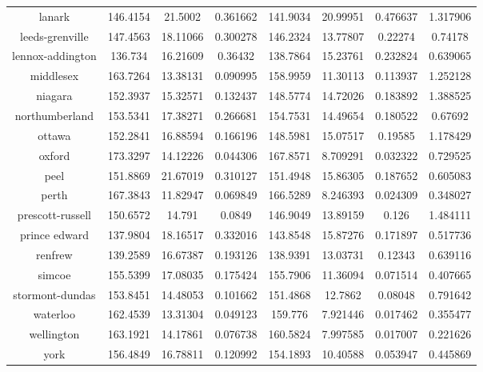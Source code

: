 \begin{table}[H]
\begin{tabular}{|c|ccc|ccc|c|}
lanark                    & 146.4154 & 21.5002  & 0.361662 & 141.9034 & 20.99951 & 0.476637 & 1.317906 \\
leeds-grenville           & 147.4563 & 18.11066 & 0.300278 & 146.2324 & 13.77807 & 0.22274  & 0.74178  \\
lennox-addington          & 136.734  & 16.21609 & 0.36432  & 138.7864 & 15.23761 & 0.232824 & 0.639065 \\
middlesex                 & 163.7264 & 13.38131 & 0.090995 & 158.9959 & 11.30113 & 0.113937 & 1.252128 \\
niagara                   & 152.3937 & 15.32571 & 0.132437 & 148.5774 & 14.72026 & 0.183892 & 1.388525 \\
northumberland            & 153.5341 & 17.38271 & 0.266681 & 154.7531 & 14.49654 & 0.180522 & 0.67692  \\
ottawa                    & 152.2841 & 16.88594 & 0.166196 & 148.5981 & 15.07517 & 0.19585  & 1.178429 \\
oxford                    & 173.3297 & 14.12226 & 0.044306 & 167.8571 & 8.709291 & 0.032322 & 0.729525 \\
peel                      & 151.8869 & 21.67019 & 0.310127 & 151.4948 & 15.86305 & 0.187652 & 0.605083 \\
perth                     & 167.3843 & 11.82947 & 0.069849 & 166.5289 & 8.246393 & 0.024309 & 0.348027 \\
prescott-russell          & 150.6572 & 14.791   & 0.0849   & 146.9049 & 13.89159 & 0.126    & 1.484111 \\
prince edward             & 137.9804 & 18.16517 & 0.332016 & 143.8548 & 15.87276 & 0.171897 & 0.517736 \\
renfrew                   & 139.2589 & 16.67387 & 0.193126 & 138.9391 & 13.03731 & 0.12343  & 0.639116 \\
simcoe                    & 155.5399 & 17.08035 & 0.175424 & 155.7906 & 11.36094 & 0.071514 & 0.407665 \\
stormont-dundas & 153.8451 & 14.48053 & 0.101662 & 151.4868 & 12.7862  & 0.08048  & 0.791642 \\
waterloo                  & 162.4539 & 13.31304 & 0.049123 & 159.776  & 7.921446 & 0.017462 & 0.355477 \\
wellington                & 163.1921 & 14.17861 & 0.076738 & 160.5824 & 7.997585 & 0.017007 & 0.221626 \\
york                      & 156.4849 & 16.78811 & 0.120992 & 154.1893 & 10.40588 & 0.053947 & 0.445869


\\
\hline
\end{tabular}
\end{table}


